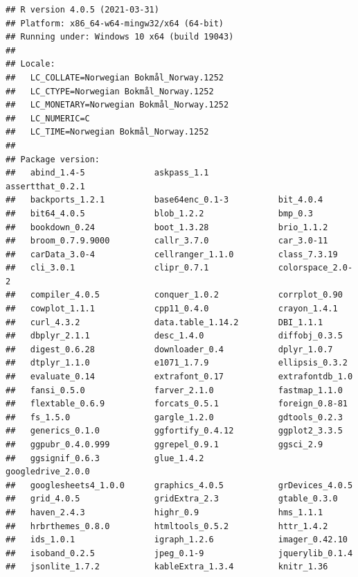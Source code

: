 \documentclass[
]{book}
\begin{document}
\begin{verbatim}
## R version 4.0.5 (2021-03-31)
## Platform: x86_64-w64-mingw32/x64 (64-bit)
## Running under: Windows 10 x64 (build 19043)
## 
## Locale:
##   LC_COLLATE=Norwegian Bokmål_Norway.1252 
##   LC_CTYPE=Norwegian Bokmål_Norway.1252   
##   LC_MONETARY=Norwegian Bokmål_Norway.1252
##   LC_NUMERIC=C                            
##   LC_TIME=Norwegian Bokmål_Norway.1252    
## 
## Package version:
##   abind_1.4-5              askpass_1.1              assertthat_0.2.1        
##   backports_1.2.1          base64enc_0.1-3          bit_4.0.4               
##   bit64_4.0.5              blob_1.2.2               bmp_0.3                 
##   bookdown_0.24            boot_1.3.28              brio_1.1.2              
##   broom_0.7.9.9000         callr_3.7.0              car_3.0-11              
##   carData_3.0-4            cellranger_1.1.0         class_7.3.19            
##   cli_3.0.1                clipr_0.7.1              colorspace_2.0-2        
##   compiler_4.0.5           conquer_1.0.2            corrplot_0.90           
##   cowplot_1.1.1            cpp11_0.4.0              crayon_1.4.1            
##   curl_4.3.2               data.table_1.14.2        DBI_1.1.1               
##   dbplyr_2.1.1             desc_1.4.0               diffobj_0.3.5           
##   digest_0.6.28            downloader_0.4           dplyr_1.0.7             
##   dtplyr_1.1.0             e1071_1.7.9              ellipsis_0.3.2          
##   evaluate_0.14            extrafont_0.17           extrafontdb_1.0         
##   fansi_0.5.0              farver_2.1.0             fastmap_1.1.0           
##   flextable_0.6.9          forcats_0.5.1            foreign_0.8-81          
##   fs_1.5.0                 gargle_1.2.0             gdtools_0.2.3           
##   generics_0.1.0           ggfortify_0.4.12         ggplot2_3.3.5           
##   ggpubr_0.4.0.999         ggrepel_0.9.1            ggsci_2.9               
##   ggsignif_0.6.3           glue_1.4.2               googledrive_2.0.0       
##   googlesheets4_1.0.0      graphics_4.0.5           grDevices_4.0.5         
##   grid_4.0.5               gridExtra_2.3            gtable_0.3.0            
##   haven_2.4.3              highr_0.9                hms_1.1.1               
##   hrbrthemes_0.8.0         htmltools_0.5.2          httr_1.4.2              
##   ids_1.0.1                igraph_1.2.6             imager_0.42.10          
##   isoband_0.2.5            jpeg_0.1-9               jquerylib_0.1.4         
##   jsonlite_1.7.2           kableExtra_1.3.4         knitr_1.36              

\end{verbatim}
\end{document}
